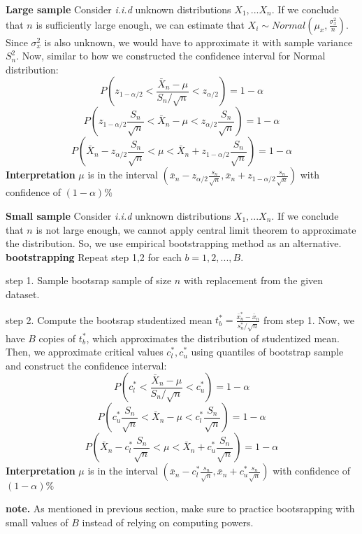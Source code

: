\documentclass[a4paper]{article}
\begin{document}
\begin{mdframed}
    \textbf{Large sample}
    \newline
    Consider \textit{i.i.d} unknown distributions $X_1,...X_n$. If we conclude that $n$ is sufficiently large enough, we can estimate that $X_i \sim Normal(\mu_{x}, \frac{\sigma_{x}^2}{n})$. Since $\sigma_x^2$ is also unknown, we would have to approximate it with sample variance $S_n^2$. Now, similar to how we constructed the confidence interval for Normal distribution:
    $$P(z_{1-\alpha/2}<\frac{\bar{X}_n - {\mu}}{S_n/\sqrt{n}}<z_{\alpha/2}) = 1-\alpha$$
    $$P(z_{1-\alpha/2}\frac{S_n}{\sqrt{n}}<\bar{X}_n - {\mu}< z_{\alpha/2}\frac{S_n}{\sqrt{n}}) = 1-\alpha$$
    $$P(\bar{X}_n-z_{\alpha/2}\frac{S_n}{\sqrt{n}}<\mu< \bar{X}_n+z_{1-\alpha/2}\frac{S_n}{\sqrt{n}}) = 1-\alpha$$
    \newline
    \textbf{Interpretation}
    \newline
    $\mu$ is in the interval $(\bar{x}_n-z_{\alpha/2}\frac{s_n}{\sqrt{n}}, \bar{x}_n+z_{1-\alpha/2}\frac{s_n}{\sqrt{n}})$ with confidence of $(1-\alpha)\%$
\end{mdframed}
\begin{mdframed}
    \textbf{Small sample}
    \newline
    Consider \textit{i.i.d} unknown distributions $X_1,...X_n$. If we conclude that $n$ is not large enough, we cannot apply central limit theorem to approximate the distribution. So, we use empirical bootstrapping method as an alternative.
    \newline
    \textbf{bootstrapping}
    \newline
    Repeat step 1,2 for each $b=1,2,...,B$. 

        step 1. Sample bootsrap sample of size $n$ with replacement from the given dataset.

        step 2. Compute the bootsrap studentized mean $t^{*}_b=\frac{\bar{x}^{*}_{n}-\bar{x}_n}{s^{*}_n/\sqrt{n}}$ from step 1.
    \newline
    Now, we have $B$ copies of $t^{*}_b$, which approximates the distribution of studentized mean. Then, we approximate critical values $c^{*}_l, c^{*}_u$ using quantiles of bootstrap sample and construct the confidence interval:
    $$P(c^{*}_{l}<\frac{\bar{X}_n - {\mu}}{S_n/\sqrt{n}}<c^{*}_{u}) = 1-\alpha$$
    $$P(c^{*}_{u}\frac{S_n}{\sqrt{n}}<\bar{X}_n - {\mu}< c^{*}_{l}\frac{S_n}{\sqrt{n}}) = 1-\alpha$$
    $$P(\bar{X}_n-c^{*}_{l}\frac{S_n}{\sqrt{n}}<\mu< \bar{X}_n+c^{*}_{u}\frac{S_n}{\sqrt{n}}) = 1-\alpha$$
    \newline
    \textbf{Interpretation}
    \newline
    $\mu$ is in the interval $(\bar{x}_n-c^{*}_{l}\frac{s_n}{\sqrt{n}}, \bar{x}_n+c^{*}_{u}\frac{s_n}{\sqrt{n}})$ with confidence of $(1-\alpha)\%$
\end{mdframed}
\textbf{note.}
\newline
As mentioned in previous section, make sure to practice bootsrapping with small values of $B$ instead of relying on computing powers. 
\end{document}
